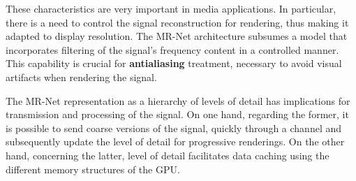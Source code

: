 These characteristics are very important in media applications. In particular, there is a need to control the signal reconstruction for rendering, thus making it adapted to display resolution. The MR-Net architecture subsumes a model that incorporates filtering of the signal's frequency content in a controlled manner. This capability is crucial for \textbf{antialiasing} treatment, necessary to avoid visual artifacts when rendering the signal.

The MR-Net representation as a hierarchy of levels of detail has implications for transmission and processing of the signal. On one hand, regarding the former, it is possible to send coarse versions of the signal, quickly through a channel and subsequently update the level of detail for progressive renderings. On the other hand, concerning the latter, level of detail facilitates data caching using the different memory structures of the GPU.



